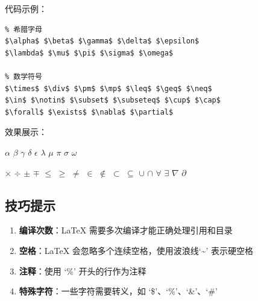 代码示例：

\begin{verbatim}
% 希腊字母
$\alpha$ $\beta$ $\gamma$ $\delta$ $\epsilon$
$\lambda$ $\mu$ $\pi$ $\sigma$ $\omega$

% 数学符号
$\times$ $\div$ $\pm$ $\mp$ $\leq$ $\geq$ $\neq$
$\in$ $\notin$ $\subset$ $\subseteq$ $\cup$ $\cap$
$\forall$ $\exists$ $\nabla$ $\partial$
\end{verbatim}

效果展示：

$\alpha$ $\beta$ $\gamma$ $\delta$ $\epsilon$
$\lambda$ $\mu$ $\pi$ $\sigma$ $\omega$

$\times$ $\div$ $\pm$ $\mp$ $\leq$ $\geq$ $\neq$
$\in$ $\notin$ $\subset$ $\subseteq$ $\cup$ $\cap$
$\forall$ $\exists$ $\nabla$ $\partial$

\subsection{技巧提示}
\begin{enumerate}
\item \textbf{编译次数}：LaTeX 需要多次编译才能正确处理引用和目录
\item \textbf{空格}：LaTeX 会忽略多个连续空格，使用波浪线`\textasciitilde' 表示硬空格
\item \textbf{注释}：使用 `\%' 开头的行作为注释
\item \textbf{特殊字符}：一些字符需要转义，如 `\$'、`\%'、`\&'、`\#'
\end{enumerate}